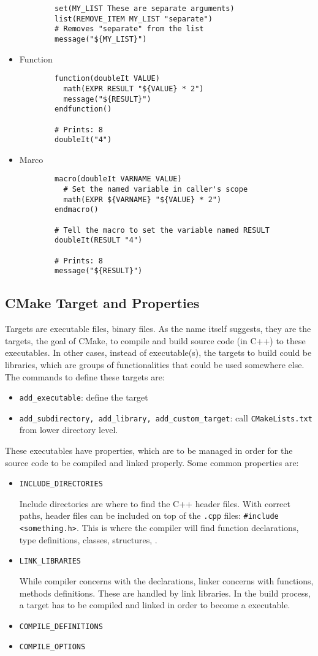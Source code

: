 \begin{itemize}
\begin{verbatim}
		set(MY_LIST These are separate arguments)
		list(REMOVE_ITEM MY_LIST "separate")
		# Removes "separate" from the list
		message("${MY_LIST}")
	\end{verbatim}
	\item Function
	\begin{verbatim}
		function(doubleIt VALUE)
		  math(EXPR RESULT "${VALUE} * 2")
		  message("${RESULT}")
		endfunction()
		
		# Prints: 8
		doubleIt("4")
	\end{verbatim}
	\item Marco
	\begin{verbatim}
		macro(doubleIt VARNAME VALUE)
		  # Set the named variable in caller's scope
		  math(EXPR ${VARNAME} "${VALUE} * 2")
		endmacro()
		
		# Tell the macro to set the variable named RESULT
		doubleIt(RESULT "4")					
		
		# Prints: 8
		message("${RESULT}")					
	\end{verbatim}
\end{itemize}

\subsection{CMake Target and Properties}
Targets are executable files, binary files. As the name itself suggests, they are the targets, the goal of CMake, to compile and build source code (in C++) to these executables. In other cases, instead of executable(s), the targets to build could be libraries, which are groups of functionalities that could be used somewhere else. The commands to define these targets are:
\begin{itemize}
	\setlength\itemsep{0em}
	\item \verb|add_executable|: define the target
	\item \verb|add_subdirectory, add_library, add_custom_target|: call \verb|CMakeLists.txt| from lower directory level.
\end{itemize}

These executables have properties, which are to be managed in order for the source code to be compiled and linked properly. Some common properties are:
\begin{itemize}
	\setlength\itemsep{0em}
	\item \verb|INCLUDE_DIRECTORIES|
	
	Include directories are where to find the C++ header files. With correct paths, header files can be included on top of the \verb|.cpp| files: \verb|#include <something.h>|. This is where the compiler will find function declarations, type definitions, classes, structures, \etc.
	\item \verb|LINK_LIBRARIES|
	
	While compiler concerns with the declarations, linker concerns with functions, methods definitions. These are handled by link libraries. In the build process, a target has to be compiled and linked in order to become a executable.
	\item \verb|COMPILE_DEFINITIONS|
	\item \verb|COMPILE_OPTIONS|
\end{itemize}

